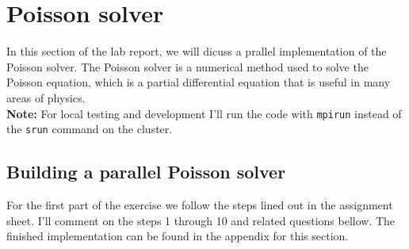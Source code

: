 \section{Poisson solver}
\label{sec:poisson}
\renewcommand{\thesubsection}{\thesection.\arabic{subsection}}
In this section of the lab report, we will dicuss a prallel implementation of the Poisson solver. The Poisson solver is a numerical method used to solve the Poisson equation, which is a partial differential equation that is useful in many areas of physics. \\
\textbf{Note:} For local testing and development I'll run the code with \texttt{mpirun} instead of the \texttt{srun} command on the cluster. \\

\subsection{Building a parallel Poisson solver}
For the first part of the exercise we follow the steps lined out in the assignment sheet. I'll comment on the steps 1 through 10 and related questions bellow. The finished implementation can be found in the appendix for this section. \\
